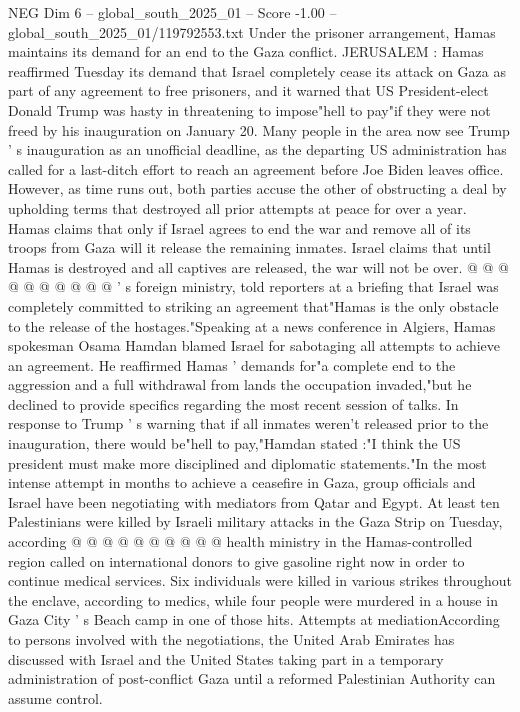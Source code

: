 \begin{textsample}{NEG Dim 6 – global\_south\_2025\_01 – Score -1.00 – global\_south\_2025\_01/119792553.txt}  \label{ex:f6_neg_010}
Under the prisoner arrangement, Hamas maintains its demand for an end to the Gaza conflict.
JERUSALEM : Hamas reaffirmed Tuesday its demand that Israel completely cease its attack on Gaza as part of any agreement to free prisoners, and it warned that US President-elect Donald Trump was hasty in threatening to impose"hell to pay"if they were not freed by his inauguration on January 20.
Many people in the area now see Trump ' s inauguration as an unofficial deadline, as the departing US administration has called for a last-ditch effort to reach an agreement before Joe Biden leaves office.
However, as time runs out, both parties accuse the other of obstructing a deal by upholding terms that destroyed all prior attempts at peace for over a year.
Hamas claims that only if Israel agrees to end the war and remove all of its troops from Gaza will it release the remaining inmates.
Israel claims that until Hamas is destroyed and all captives are released, the war will not be over. @ @ @ @ @ @ @ @ @ @ ' s foreign ministry, told reporters at a briefing that Israel was completely committed to striking an agreement that"Hamas is the only obstacle to the release of the hostages."Speaking at a news conference in Algiers, Hamas spokesman Osama Hamdan blamed Israel for sabotaging all attempts to achieve an agreement.
He reaffirmed Hamas ' demands for"a complete end to the aggression and a full withdrawal from lands the occupation invaded,"but he declined to provide specifics regarding the most recent session of talks.
In response to Trump ' s warning that if all inmates weren't released prior to the inauguration, there would be"hell to pay,"Hamdan stated :"I think the US president must make more disciplined and diplomatic statements."In the most intense attempt in months to achieve a ceasefire in Gaza, group officials and Israel have been negotiating with mediators from Qatar and Egypt.
At least ten Palestinians were killed by Israeli military attacks in the Gaza Strip on Tuesday, according @ @ @ @ @ @ @ @ @ @ health ministry in the Hamas-controlled region called on international donors to give gasoline right now in order to continue medical services.
Six individuals were killed in various strikes throughout the enclave, according to medics, while four people were murdered in a house in Gaza City ' s Beach camp in one of those hits.
Attempts at mediationAccording to persons involved with the negotiations, the United Arab Emirates has discussed with Israel and the United States taking part in a temporary administration of post-conflict Gaza until a reformed Palestinian Authority can assume control.

\end{textsample}
